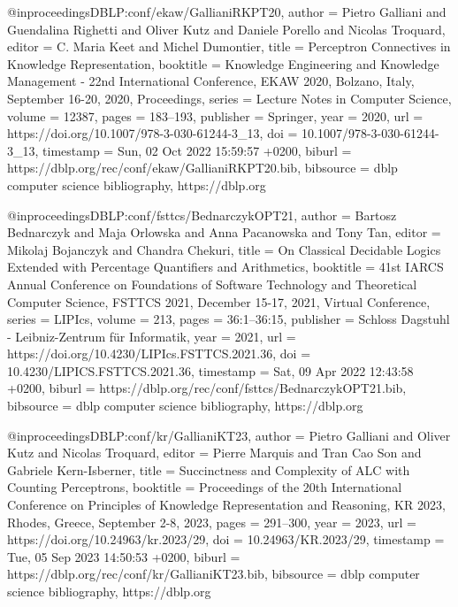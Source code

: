 @inproceedings{DBLP:conf/ekaw/GallianiRKPT20,
  author       = {Pietro Galliani and
                  Guendalina Righetti and
                  Oliver Kutz and
                  Daniele Porello and
                  Nicolas Troquard},
  editor       = {C. Maria Keet and
                  Michel Dumontier},
  title        = {Perceptron Connectives in Knowledge Representation},
  booktitle    = {Knowledge Engineering and Knowledge Management - 22nd International
                  Conference, {EKAW} 2020, Bolzano, Italy, September 16-20, 2020, Proceedings},
  series       = {Lecture Notes in Computer Science},
  volume       = {12387},
  pages        = {183--193},
  publisher    = {Springer},
  year         = {2020},
  url          = {https://doi.org/10.1007/978-3-030-61244-3\_13},
  doi          = {10.1007/978-3-030-61244-3\_13},
  timestamp    = {Sun, 02 Oct 2022 15:59:57 +0200},
  biburl       = {https://dblp.org/rec/conf/ekaw/GallianiRKPT20.bib},
  bibsource    = {dblp computer science bibliography, https://dblp.org}
}

@inproceedings{DBLP:conf/fsttcs/BednarczykOPT21,
  author       = {Bartosz Bednarczyk and
                  Maja Orlowska and
                  Anna Pacanowska and
                  Tony Tan},
  editor       = {Mikolaj Bojanczyk and
                  Chandra Chekuri},
  title        = {On Classical Decidable Logics Extended with Percentage Quantifiers
                  and Arithmetics},
  booktitle    = {41st {IARCS} Annual Conference on Foundations of Software Technology
                  and Theoretical Computer Science, {FSTTCS} 2021, December 15-17, 2021,
                  Virtual Conference},
  series       = {LIPIcs},
  volume       = {213},
  pages        = {36:1--36:15},
  publisher    = {Schloss Dagstuhl - Leibniz-Zentrum f{\"{u}}r Informatik},
  year         = {2021},
  url          = {https://doi.org/10.4230/LIPIcs.FSTTCS.2021.36},
  doi          = {10.4230/LIPICS.FSTTCS.2021.36},
  timestamp    = {Sat, 09 Apr 2022 12:43:58 +0200},
  biburl       = {https://dblp.org/rec/conf/fsttcs/BednarczykOPT21.bib},
  bibsource    = {dblp computer science bibliography, https://dblp.org}
}

@inproceedings{DBLP:conf/kr/GallianiKT23,
  author       = {Pietro Galliani and
                  Oliver Kutz and
                  Nicolas Troquard},
  editor       = {Pierre Marquis and
                  Tran Cao Son and
                  Gabriele Kern{-}Isberner},
  title        = {Succinctness and Complexity of {ALC} with Counting Perceptrons},
  booktitle    = {Proceedings of the 20th International Conference on Principles of
                  Knowledge Representation and Reasoning, {KR} 2023, Rhodes, Greece,
                  September 2-8, 2023},
  pages        = {291--300},
  year         = {2023},
  url          = {https://doi.org/10.24963/kr.2023/29},
  doi          = {10.24963/KR.2023/29},
  timestamp    = {Tue, 05 Sep 2023 14:50:53 +0200},
  biburl       = {https://dblp.org/rec/conf/kr/GallianiKT23.bib},
  bibsource    = {dblp computer science bibliography, https://dblp.org}
}

